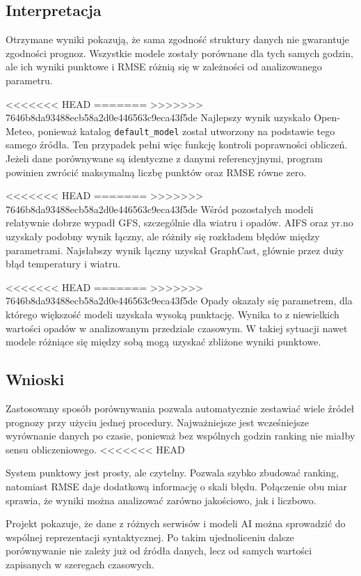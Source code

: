 \documentclass[a4paper,12pt]{article}
\begin{document}
\begin{table}[h]
\begin{table}[h]
\begin{table}[h]
\begin{table}[h]
\subsection{Interpretacja}

Otrzymane wyniki pokazują, że sama zgodność struktury danych nie gwarantuje
zgodności prognoz. Wszystkie modele zostały porównane dla tych samych godzin,
ale ich wyniki punktowe i RMSE różnią się w zależności od analizowanego
parametru.

<<<<<<< HEAD
=======
\noindent
>>>>>>> 7646b8da93488ecb58a2d0e446563c9eca43f5de
Najlepszy wynik uzyskało Open-Meteo, ponieważ katalog \texttt{default\_model}
został utworzony na podstawie tego samego źródła. Ten przypadek pełni więc
funkcję kontroli poprawności obliczeń. Jeżeli dane porównywane są identyczne
z danymi referencyjnymi, program powinien zwrócić maksymalną liczbę punktów
oraz RMSE równe zero.

<<<<<<< HEAD
=======
\noindent
>>>>>>> 7646b8da93488ecb58a2d0e446563c9eca43f5de
Wśród pozostałych modeli relatywnie dobrze wypadł GFS, szczególnie dla wiatru
i opadów. AIFS oraz yr.no uzyskały podobny wynik łączny, ale różniły się
rozkładem błędów między parametrami. Najsłabszy wynik łączny uzyskał
GraphCast, głównie przez duży błąd temperatury i wiatru.

<<<<<<< HEAD
=======
\noindent
>>>>>>> 7646b8da93488ecb58a2d0e446563c9eca43f5de
Opady okazały się parametrem, dla którego większość modeli uzyskała wysoką
punktację. Wynika to z niewielkich wartości opadów w analizowanym przedziale
czasowym. W takiej sytuacji nawet modele różniące się między sobą mogą
uzyskać zbliżone wyniki punktowe.

\subsection{Wnioski}

Zastosowany sposób porównywania pozwala automatycznie zestawiać wiele źródeł
prognozy przy użyciu jednej procedury. Najważniejsze jest wcześniejsze
wyrównanie danych po czasie, ponieważ bez wspólnych godzin ranking nie miałby
sensu obliczeniowego.
<<<<<<< HEAD

System punktowy jest prosty, ale czytelny. Pozwala szybko zbudować ranking,
natomiast RMSE daje dodatkową informację o skali błędu. Połączenie obu miar
sprawia, że wyniki można analizować zarówno jakościowo, jak i liczbowo.

Projekt pokazuje, że dane z różnych serwisów i modeli AI można sprowadzić do
wspólnej reprezentacji syntaktycznej. Po takim ujednoliceniu dalsze
porównywanie nie zależy już od źródła danych, lecz od samych wartości
zapisanych w szeregach czasowych.


\end{table}
\end{table}
\end{table}
\end{table}
\end{document}
